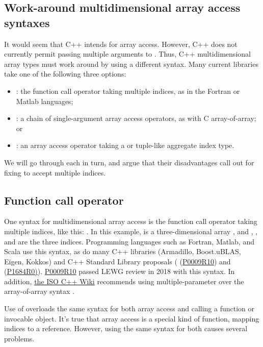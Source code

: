 \documentclass{wg21}
\begin{document}
\subsection{Work-around multidimensional array access syntaxes}

It would seem that C++ intends  for array access.  However, C++ does not currently permit passing multiple arguments to .  Thus, C++ multidimensional array types must work around by using a different syntax.  Many current libraries take one of the following three options:

\begin{itemize}
\item {}: the function call operator taking multiple indices, as in the Fortran or Matlab languages;
\item {}: a chain of single-argument array access operators, as with C array-of-array; or
\item {}: an array access operator taking a  or tuple-like aggregate index type.
\end{itemize}

We will go through each in turn, and argue that their disadvantages call out for fixing  to accept multiple indices.

\subsection{Function call operator}

One syntax for multidimensional array access is the function call operator taking multiple indices, like this: .  In this example,  is a three-dimensional array , and , , and  are the three indices.  Programming languages such as Fortran, Matlab, and Scala use this syntax, as do many C++ libraries (Armadillo, Boost.uBLAS, Eigen, Kokkos) and C++ Standard Library proposals ( (\href{wg21.link/p0009r10}{P0009R10}) and  (\href{wg21.link/p1684r0}{P1684R0)}).  \href{wg21.link/p0009r10}{P0009R10} passed LEWG review in 2018 with this syntax.  In addition, \href{https://isocpp.org/wiki/faq/operator-overloading#matrix-subscript-op}{the ISO C++ Wiki} recommends using multiple-parameter  over the array-of-array syntax .

Use of  overloads the same syntax for both array access and calling a function or invocable object.  It's true that array access is a special kind of function, mapping indices to a reference.  However, using the same syntax for both causes several problems.
\end{document}
